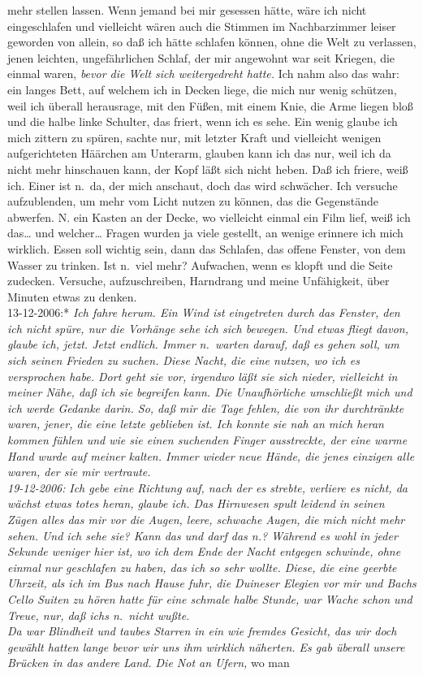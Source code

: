 \documentclass[
]{article}
\begin{document}
mehr stellen lassen. Wenn jemand bei mir gesessen hätte, wäre ich nicht
eingeschlafen und vielleicht wären auch die Stimmen im Nachbarzimmer
leiser geworden von allein, so daß ich hätte schlafen können, ohne die
Welt zu verlassen, jenen leichten, ungefährlichen Schlaf, der mir
angewohnt war seit Kriegen, die einmal waren, \emph{bevor die Welt sich
weitergedreht hatte.} Ich nahm also das wahr: ein langes Bett, auf
welchem ich in Decken liege, die mich nur wenig schützen, weil ich
überall herausrage, mit den Füßen, mit einem Knie, die Arme liegen bloß
und die halbe linke Schulter, das friert, wenn ich es sehe. Ein wenig
glaube ich mich zittern zu spüren, sachte nur, mit letzter Kraft und
vielleicht wenigen aufgerichteten Häärchen am Unterarm, glauben kann ich
das nur, weil ich da nicht mehr hinschauen kann, der Kopf läßt sich
nicht heben. Daß ich friere, weiß ich. Einer ist n.~da, der mich
anschaut, doch das wird schwächer. Ich versuche aufzublenden, um mehr
vom Licht nutzen zu können, das die Gegenstände abwerfen. N. ein Kasten
an der Decke, wo vielleicht einmal ein Film lief, weiß ich das\ldots{}
und welcher\ldots{} Fragen wurden ja viele gestellt, an wenige erinnere
ich mich wirklich. Essen soll wichtig sein, dann das Schlafen, das
offene Fenster, von dem Wasser zu trinken. Ist n.~viel mehr? Aufwachen,
wenn es klopft und die Seite zudecken. Versuche, aufzuschreiben,
Harndrang und meine Unfähigkeit, über Minuten etwas zu denken.\\
13-12-2006:* \emph{Ich fahre herum. Ein Wind ist eingetreten durch das
Fenster, den ich nicht spüre, nur die Vorhänge sehe ich sich bewegen.
Und etwas fliegt davon, glaube ich, jetzt. Jetzt endlich. Immer
n.~warten darauf, daß es gehen soll, um sich seinen Frieden zu suchen.
Diese Nacht, die eine nutzen, wo ich es versprochen habe. Dort geht sie
vor, irgendwo läßt sie sich nieder, vielleicht in meiner Nähe, daß ich
sie begreifen kann. Die Unaufhörliche umschließt mich und ich werde
Gedanke darin. So, daß mir die Tage fehlen, die von ihr durchtränkte
waren, jener, die eine letzte geblieben ist. Ich konnte sie nah an mich
heran kommen fühlen und wie sie einen suchenden Finger ausstreckte, der
eine warme Hand wurde auf meiner kalten. Immer wieder neue Hände, die
jenes einzigen alle waren, der sie mir vertraute.\\
19-12-2006:} \emph{Ich gebe eine Richtung auf, nach der es strebte,
verliere es nicht, da wächst etwas totes heran, glaube ich. Das
Hirnwesen spult leidend in seinen Zügen alles das mir vor die Augen,
leere, schwache Augen, die mich nicht mehr sehen. Und ich sehe sie? Kann
das und darf das n.? Während es wohl in jeder Sekunde weniger hier ist,
wo ich dem Ende der Nacht entgegen schwinde, ohne einmal nur geschlafen
zu haben, das ich so sehr wollte. Diese, die eine geerbte Uhrzeit, als
ich im Bus nach Hause fuhr, die Duineser Elegien vor mir und Bachs Cello
Suiten zu hören hatte für eine schmale halbe Stunde, war Wache schon und
Treue, nur, daß ichs n.~nicht wußte.\\
Da war Blindheit und taubes Starren in ein wie fremdes Gesicht, das wir
doch gewählt hatten lange bevor wir uns ihm wirklich näherten. Es gab
überall unsere Brücken in das andere Land. Die Not an Ufern, }wo man
\end{document}
